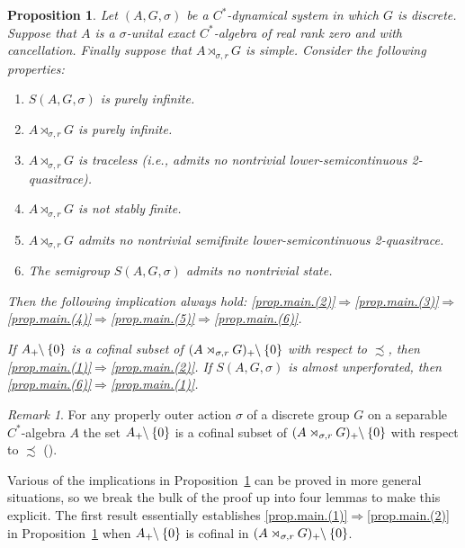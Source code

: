 \documentclass[a4paper, 12pt]{amsart}
\numberwithin{equation}{section}
\newcounter{theorem}
\newtheorem{prop}[theorem]{Proposition}
\theoremstyle{remark}
\newtheorem{remark}[theorem]{Remark}
\theoremstyle{definition}
\begin{document}
\begin{prop}\label{prop.main}
Let $(A,G,\sigma)$ be a $C^*$-dynamical system in which $G$ is discrete.
Suppose that $A$
is a $\sigma$-unital exact $C^*$-algebra of real rank zero and with cancellation.
Finally suppose that
$A\rtimes_{\sigma,r} G$ is simple. Consider the following properties:
\begin{enumerate}
\item\label{prop.main.(1)} $S(A,G,\sigma)$ is purely infinite.
\item\label{prop.main.(2)} $A\rtimes_{\sigma,r} G$ is purely infinite.
\item\label{prop.main.(3)} $A\rtimes_{\sigma,r} G$ is traceless (i.e., admits no nontrivial lower-semicontinuous 2-quasitrace).
\item\label{prop.main.(4)} $A\rtimes_{\sigma,r} G$ is not stably finite.
\item\label{prop.main.(5)} $A\rtimes_{\sigma,r} G$ admits no nontrivial \emph{semifinite} lower-semicontinuous 2-quasitrace.
\item\label{prop.main.(6)} The semigroup $S(A,G,\sigma)$ admits no nontrivial state.
\end{enumerate}
Then the following implication always hold:
\eqref{prop.main.(2)}$\Rightarrow$\eqref{prop.main.(3)}$\Rightarrow$\eqref{prop.main.(4)}$\Rightarrow$\eqref{prop.main.(5)}$\Rightarrow$\eqref{prop.main.(6)}.

If $A_+{\negthickspace}\setminus\{0\}$ is a cofinal subset of $(A\rtimes_{\sigma,r}
G)_+{\negthickspace}\setminus\{0\}$ with respect to $\precsim$, then \eqref{prop.main.(1)}$\Rightarrow$\eqref{prop.main.(2)}. If
$S(A,G,\sigma)$ is almost unperforated, then \eqref{prop.main.(6)}$\Rightarrow$\eqref{prop.main.(1)}.
\end{prop}

\begin{remark}\label{rem.cofinal}
For any properly outer action $\sigma$ of a discrete group $G$ on a separable
$C^*$-algebra $A$ the set $A_+{\negthickspace}\setminus\{0\}$ is a cofinal subset of
$(A\rtimes_{\sigma,r} G)_+{\negthickspace}\setminus\{0\}$ with respect to $\precsim$
(\cite{Sie}).
\end{remark}

Various of the implications in Proposition~\ref{prop.main} can be proved in more general
situations, so we break the bulk of the proof up into four lemmas to make this explicit.
The first result essentially establishes \eqref{prop.main.(1)}$\Rightarrow$\eqref{prop.main.(2)} in
Proposition~\ref{prop.main} when $A_+{\negthickspace}\setminus\{0\}$ is cofinal in $(A\rtimes_{\sigma,r}
G)_+{\negthickspace}\setminus\{0\}$.
\end{document}
